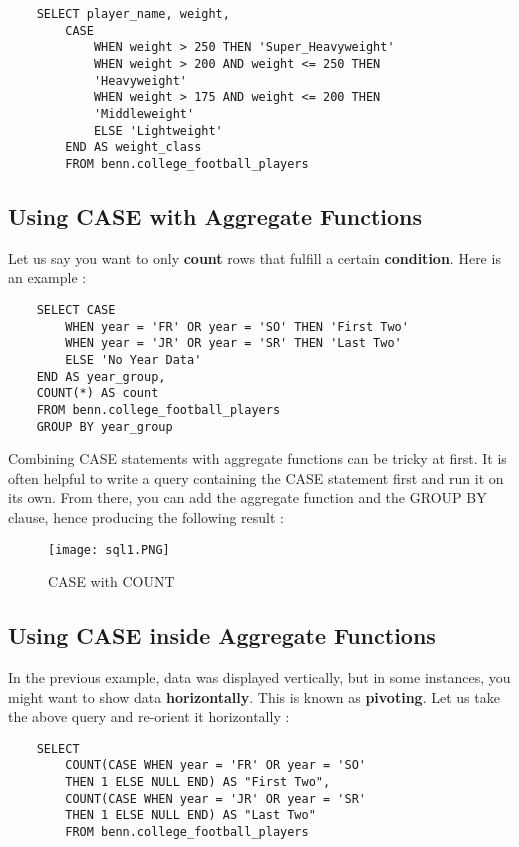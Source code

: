 \documentclass[12pt, letterpaper]{article}
\begin{document}
\begin{verbatim}
    SELECT player_name, weight,
        CASE 
            WHEN weight > 250 THEN 'Super_Heavyweight'
            WHEN weight > 200 AND weight <= 250 THEN
            'Heavyweight'
            WHEN weight > 175 AND weight <= 200 THEN
            'Middleweight'
            ELSE 'Lightweight' 
        END AS weight_class
        FROM benn.college_football_players
\end{verbatim}

\subsection{Using CASE with Aggregate Functions}
Let us say you want to only \textbf{count} rows that fulfill a certain \textbf{condition}. Here is an example : 

\begin{verbatim}
    SELECT CASE 
        WHEN year = 'FR' OR year = 'SO' THEN 'First Two'
        WHEN year = 'JR' OR year = 'SR' THEN 'Last Two'
        ELSE 'No Year Data' 
    END AS year_group,
    COUNT(*) AS count
    FROM benn.college_football_players
    GROUP BY year_group
\end{verbatim}

Combining CASE statements with aggregate functions can be tricky at first. It is often helpful to write a query containing the CASE statement first and run it on its own. From there, you can add the aggregate function and the GROUP BY clause, hence producing the following result : 

\begin{figure}[H]
    \centering
    \texttt{[image: sql1.PNG]}
    \caption{CASE with COUNT}
    \label{fig1}
\end{figure}

\subsection{Using CASE inside Aggregate Functions}
In the previous example, data was displayed vertically, but in some instances, you might want to show data \textbf{horizontally}. This is known as \textbf{pivoting}. Let us take the above query and re-orient it horizontally : 

\begin{verbatim}
    SELECT 
        COUNT(CASE WHEN year = 'FR' OR year = 'SO'
        THEN 1 ELSE NULL END) AS "First Two",
        COUNT(CASE WHEN year = 'JR' OR year = 'SR'
        THEN 1 ELSE NULL END) AS "Last Two"
        FROM benn.college_football_players
\end{verbatim}
\end{document}

